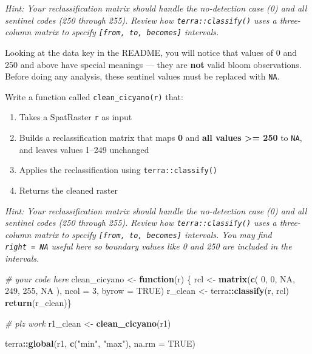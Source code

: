 \documentclass[
]{article}
\newenvironment{Shaded}{\begin{snugshade}}{\end{snugshade}}
\newcommand{\AttributeTok}[1]{\textcolor[rgb]{0.13,0.29,0.53}{#1}}
\newcommand{\CommentTok}[1]{\textcolor[rgb]{0.56,0.35,0.01}{\textit{#1}}}
\newcommand{\ConstantTok}[1]{\textcolor[rgb]{0.56,0.35,0.01}{#1}}
\newcommand{\ControlFlowTok}[1]{\textcolor[rgb]{0.13,0.29,0.53}{\textbf{#1}}}
\newcommand{\DecValTok}[1]{\textcolor[rgb]{0.00,0.00,0.81}{#1}}
\newcommand{\FunctionTok}[1]{\textcolor[rgb]{0.13,0.29,0.53}{\textbf{#1}}}
\newcommand{\NormalTok}[1]{#1}
\newcommand{\OtherTok}[1]{\textcolor[rgb]{0.56,0.35,0.01}{#1}}
\newcommand{\SpecialCharTok}[1]{\textcolor[rgb]{0.81,0.36,0.00}{\textbf{#1}}}
\newcommand{\StringTok}[1]{\textcolor[rgb]{0.31,0.60,0.02}{#1}}
\providecommand{\tightlist}{%
  \setlength{\itemsep}{0pt}\setlength{\parskip}{0pt}}
\begin{document}
\emph{Hint: Your reclassification matrix should handle the no-detection
case (0) and all sentinel codes (250 through 255). Review how
\texttt{terra::classify()} uses a three-column matrix to specify
\texttt{{[}from,\ to,\ becomes{]}} intervals.}

Looking at the data key in the README, you will notice that values of 0
and 250 and above have special meanings --- they are \textbf{not} valid
bloom observations. Before doing any analysis, these sentinel values
must be replaced with \texttt{NA}.

Write a function called \texttt{clean\_cicyano(r)} that:

\begin{enumerate}
\def\labelenumi{\arabic{enumi}.}
\tightlist
\item
  Takes a SpatRaster \texttt{r} as input
\item
  Builds a reclassification matrix that maps \textbf{0} and \textbf{all
  values \textgreater= 250} to \texttt{NA}, and leaves values 1--249
  unchanged
\item
  Applies the reclassification using \texttt{terra::classify()}
\item
  Returns the cleaned raster
\end{enumerate}

\emph{Hint: Your reclassification matrix should handle the no-detection
case (0) and all sentinel codes (250 through 255). Review how
\texttt{terra::classify()} uses a three-column matrix to specify
\texttt{{[}from,\ to,\ becomes{]}} intervals. You may find
\texttt{right\ =\ NA} useful here so boundary values like 0 and 250 are
included in the intervals.}

\begin{Shaded}
\begin{Highlighting}[]
\CommentTok{\# your code here}
\NormalTok{clean\_cicyano }\OtherTok{\textless{}{-}} \ControlFlowTok{function}\NormalTok{(r) \{}
\NormalTok{  rcl }\OtherTok{\textless{}{-}} \FunctionTok{matrix}\NormalTok{(}\FunctionTok{c}\NormalTok{(}
    \DecValTok{0}\NormalTok{, }\DecValTok{0}\NormalTok{, }\ConstantTok{NA}\NormalTok{,}
    \DecValTok{249}\NormalTok{, }\DecValTok{255}\NormalTok{, }\ConstantTok{NA}
\NormalTok{  ), }\AttributeTok{ncol =} \DecValTok{3}\NormalTok{, }\AttributeTok{byrow =} \ConstantTok{TRUE}\NormalTok{)}
\NormalTok{  r\_clean }\OtherTok{\textless{}{-}}\NormalTok{ terra}\SpecialCharTok{::}\FunctionTok{classify}\NormalTok{(r, rcl)}
  \FunctionTok{return}\NormalTok{(r\_clean)\}}


\CommentTok{\# plz work}
\NormalTok{r1\_clean }\OtherTok{\textless{}{-}} \FunctionTok{clean\_cicyano}\NormalTok{(r1)}

\NormalTok{terra}\SpecialCharTok{::}\FunctionTok{global}\NormalTok{(r1, }\FunctionTok{c}\NormalTok{(}\StringTok{"min"}\NormalTok{, }\StringTok{"max"}\NormalTok{), }\AttributeTok{na.rm =} \ConstantTok{TRUE}\NormalTok{)}
\end{Highlighting}
\end{Shaded}
\end{document}
